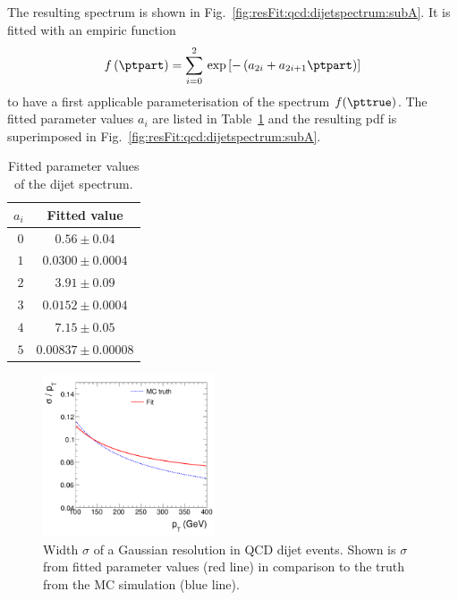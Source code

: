 \documentclass[a4paper]{cmspaper} %
\begin{document}
The resulting \ptpart spectrum is shown in Fig.~\ref{fig:resFit:qcd:dijetspectrum:subA}.
It is fitted with an empiric function
\begin{equation}
  \label{eq:resFit:qcd:ptGenSpectrum}
  f\left(\ptpart\right) = \sum^{2}_{i=0}\,\exp\left[-\left(a_{2i} + a_{2i+1}\ptpart\right)\right]
\end{equation}
to have a first applicable parameterisation of the spectrum $f(\pttrue)$.
The fitted parameter values $a_{i}$ are listed in Table~\ref{tab:resFit:qcd:dijetspectrum} and the resulting pdf is superimposed in Fig.~\ref{fig:resFit:qcd:dijetspectrum:subA}.
\begin{table}[ht]
  \centering
  \begin{tabular}{rc}
    \hline
    \hline
    $a_{i}$ & Fitted value \\
    \hline
    $0$ & $0.56 \pm 0.04$ \\
    $1$ & $0.0300 \pm 0.0004$ \\
    $2$ & $3.91 \pm 0.09$ \\
    $3$ & $0.0152 \pm 0.0004$ \\
    $4$ & $7.15 \pm 0.05$ \\
    $5$ & $0.00837 \pm 0.00008$ \\
    \hline
    \hline
  \end{tabular}
 \caption{Fitted parameter values of the dijet \ptpart spectrum.}
  \label{tab:resFit:qcd:dijetspectrum}
\end{table}

\begin{figure}[ht]
  \centering
  \includegraphics[width=0.45\textwidth]{figures/resFit_PtDependentSigma}
  \caption{Width $\sigma$ of a Gaussian resolution in QCD dijet events. Shown is $\sigma$ from fitted parameter values (red line) in comparison to the truth from the MC simulation (blue line).}
  \label{fig:resFit:qcd:ptDependentSigma}
\end{figure}
\end{document}
